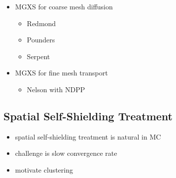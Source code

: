 \begin{itemize}[noitemsep]
  \item \ac{MGXS} for coarse mesh diffusion
  \begin{itemize}[noitemsep]
    \item Redmond
    \item Pounders
    \item Serpent
  \end{itemize}
  \item \ac{MGXS} for fine mesh transport
  \begin{itemize}[noitemsep]
    \item Nelson with NDPP
  \end{itemize}
\end{itemize}

\subsection{Spatial Self-Shielding Treatment}
\label{subsec:chap2-spatial-shield}

\begin{itemize}[noitemsep]
  \item spatial self-shielding treatment is natural in \ac{MC}
  \item challenge is slow convergence rate
  \item motivate clustering
\end{itemize}
